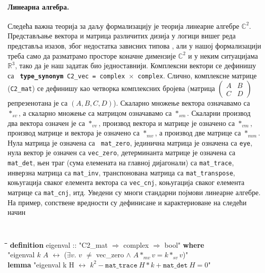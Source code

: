 \paragraph{Линеарна алгебра.}
Следећа важна теорија за даљу формализацију је теорија линеарне
алгебре $\mathbb{C}^2$.  Представљање вектора и матрица различитих
дизија у логици вишег реда представља изазов, због недостатка зависних
типова \cite{harrison05}, али у нашој формализацији треба само да
разматрамо просторе коначне димензије $\mathbb{C}^2$ и у неким
ситуацијама $\mathbb{R}^3$, тако да је наш задатак био
једноставнији. Комплексни вектори се дефинишу са {\tt {\bf
    type\_synonym} C2\_vec = complex $\times$ complex}. Слично,
комплексне матрице ({\tt C2\_mat}) се дефинишу као четворка
комплексних бројева (матрица $\left(\begin{array}{cc}A & B\\C &
  D\end{array}\right)$ репрезенотана је са $(A, B, C, D)$). Скаларно
  множење вектора означавамо са $*_{sv}$, а скаларно множење са
  матрицом означавамо са $*_{sm}$. Скаларни производ два вектора
  означен је са $*_{vv}$, производ вектора и матрице је означено са
  $*_{vm}$, производ матрице и вектора је означено са $*_{mv}$, а
  производ две матрице са $*_{mm}$. Нула матрица је означена са {\tt
    mat\_zero}, јединична матрица је означена са {\tt eye}, нула
  вектор је означен са {\tt vec\_zero}, детерминанта матрице је
  означена са {\tt mat\_det}, њен траг (сума елемената на главној
  дијагонали) са {\tt mat\_trace}, инверзна матрица са {\tt mat\_inv},
  транспонована матрица са {\tt mat\_transpose}, коњугација сваког
  елемента вектора са {\tt vec\_cnj}, коњугација сваког елемента
  матрице са {\tt mat\_cnj}, итд. Уведени су многи стандарни појмови
  линеарне алгебре. На пример, сопствене вредности су дефинисане и
  карактериоване на следећи начин
{\tt
  \begin{tabbing}
    \hspace{5mm}\=\hspace{5mm}\=\hspace{5mm}\=\hspace{5mm}\=\hspace{5mm}\=\kill
{\bf definition} eigenval :: "C2\_mat $\Rightarrow$ complex $\Rightarrow$ bool" {\bf where}\\
\>"eigenval $k$ $A$ $\longleftrightarrow$ ($\exists v.$ $v$ $\neq$ vec\_zero $\wedge$ $A *_{mv} v = k *_{sv} v$)"\\
{\bf lemma} "eigenval k H $\longleftrightarrow$ $k^2 - \mathtt{mat\_trace}\ H * k + \mathtt{mat\_det}\ H = 0$"
  \end{tabbing}
} 

